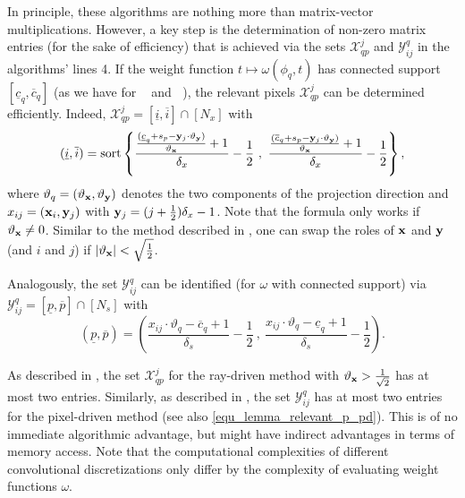 \documentclass[11pt,reqno]{amsart}
\DeclareMathOperator{\RayWeight}{\omega^\mathrm{rd}_{\delta_\mathit{x}}}
\DeclareMathOperator{\PixelWeight}{\omega^\mathrm{pd}_{\delta_\mathit{s}}}
\numberwithin{theorem}{section}
\theoremstyle{remark}
\begin{document}
In principle, these algorithms are nothing more than matrix-vector multiplications. However, a key step is the determination of non-zero matrix entries (for the sake of efficiency) that is achieved via the sets $\mathcal{X}_{qp}^j$ and $\mathcal{Y}_{ij}^q$ in the algorithms' lines 4. If the weight function $t\mapsto\omega(\phi_q,t)$ has connected support $[\underline c_q,\overline c_q]$ (as we have for $\RayWeight$ and $\PixelWeight$), the relevant pixels $\mathcal{X}_{qp}^j$ can be determined efficiently.
Indeed, $\mathcal{X}_{qp}^j=[\underline i,\overline i] \cap [N_x]$ with
\begin{equation}
(\underline i, \overline i) = \text{sort}\left\{ \frac{ \frac {(\underline c_q +s_p- \bold y_j \cdot \vartheta_{\bold y} )}{ \vartheta_{\bold x}} +1}{\delta_x} -\frac 12 \ ,\ \frac{ \frac {(\overline c_q +s_p- \bold y_j \cdot \vartheta_{\bold y} )}{ \vartheta_{\bold x}} +1}{\delta_x} -\frac 12 \right \},
\end{equation}
where $\vartheta_q = (\vartheta_{\bold x}, \vartheta_{\bold y})$ denotes the two components of the projection direction and $x_{ij}=(\bold x_i, \bold y _j)$ with $\bold y_j = (j+\frac{1}{2})\delta_x-1$. Note that the formula only works if $\vartheta_{\bold x}\neq 0$. Similar to the method described in \cite{doi:10.1118/1.4761867},  one can swap the roles of $\bold x$ and $\bold y$ (and $i$ and $j$) if $|\vartheta_{\bold x}|<\sqrt{\frac{1}{2}}$.

Analogously, the set $\mathcal{Y}_{ij}^{q}$ can be identified (for $\omega$ with connected support) via $\mathcal{Y}_{ij}^{q} = [\underline p,\overline p] \cap [N_s]$ with
\begin{equation}
(\underline p,\overline p) = \left (\frac{x_{ij}\cdot\vartheta_q - \overline c_q+1}{\delta_s}-\frac{1}{2}\ ,\ \frac{x_{ij}\cdot\vartheta_q - \underline c_q+1}{\delta_s}-\frac{1}{2} \right).
\end{equation} 

As described in \cite{10.1007/s00245-022-09933-5}, the set $\mathcal{X}_{qp}^j$ for the ray-driven method with $\vartheta_{\bold x}>\frac{1}{\sqrt{2}}$ has at most two entries. Similarly, as described in \cite{doi:10.1137/20M1326635}, the set $\mathcal{Y}_{ij}^q$ has at most two entries for the pixel-driven method (see also \eqref{equ_lemma_relevant_p_pd}). This is of no immediate algorithmic advantage, but might have indirect advantages in terms of memory access.
Note that the computational complexities of different convolutional discretizations only differ by the complexity of evaluating weight functions $\omega$.
\end{document}
